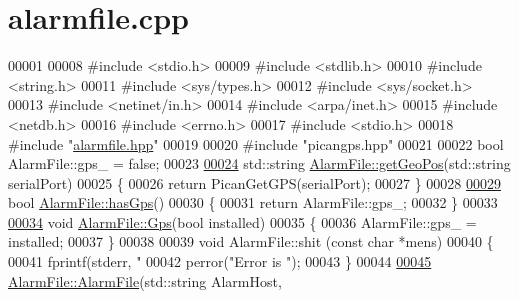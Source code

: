 \hypertarget{alarmfile_8cpp_source}{}\section{alarmfile.\+cpp}
\label{alarmfile_8cpp_source}

\begin{DoxyCode}
00001 
00008 \textcolor{preprocessor}{#include <stdio.h>}
00009 \textcolor{preprocessor}{#include <stdlib.h>}
00010 \textcolor{preprocessor}{#include <string.h>}
00011 \textcolor{preprocessor}{#include <sys/types.h>}
00012 \textcolor{preprocessor}{#include <sys/socket.h>}
00013 \textcolor{preprocessor}{#include <netinet/in.h>}
00014 \textcolor{preprocessor}{#include <arpa/inet.h>}
00015 \textcolor{preprocessor}{#include <netdb.h>}
00016 \textcolor{preprocessor}{#include <errno.h>}
00017 \textcolor{preprocessor}{#include <stdio.h>}
00018 \textcolor{preprocessor}{#include "\hyperlink{alarmfile_8hpp}{alarmfile.hpp}"}
00019 
00020 \textcolor{preprocessor}{#include "picangps.hpp"}
00021 
00022 \textcolor{keywordtype}{bool} AlarmFile::gps\_ = \textcolor{keyword}{false};
00023 
\hyperlink{classAlarmFile_a4865f7e404e938960e45b7e805956401}{00024} std::string \hyperlink{classAlarmFile_a4865f7e404e938960e45b7e805956401}{AlarmFile::getGeoPos}(std::string serialPort)
00025 \{
00026   \textcolor{keywordflow}{return} PicanGetGPS(serialPort);
00027 \}
00028 
\hyperlink{classAlarmFile_ad75728f6e44f38772372b991f21d9caa}{00029} \textcolor{keywordtype}{bool} \hyperlink{classAlarmFile_ad75728f6e44f38772372b991f21d9caa}{AlarmFile::hasGps}()
00030 \{
00031   \textcolor{keywordflow}{return} AlarmFile::gps\_;
00032 \}
00033 
\hyperlink{classAlarmFile_acfb3c406818e76439ba47aa539178f7d}{00034} \textcolor{keywordtype}{void} \hyperlink{classAlarmFile_acfb3c406818e76439ba47aa539178f7d}{AlarmFile::Gps}(\textcolor{keywordtype}{bool} installed)
00035 \{
00036   AlarmFile::gps\_ = installed;
00037 \}
00038 
00039 \textcolor{keywordtype}{void} AlarmFile::shit (\textcolor{keyword}{const} \textcolor{keywordtype}{char} *mens)
00040 \{
00041   fprintf(stderr, \textcolor{stringliteral}{"%
00042   perror(\textcolor{stringliteral}{"Error is "});
00043 \}
00044 
\hyperlink{classAlarmFile_ab5b7a78583764cd70d8b5b93a243439d}{00045} \hyperlink{classAlarmFile_ab5b7a78583764cd70d8b5b93a243439d}{AlarmFile::AlarmFile}(std::string AlarmHost,
}
\end{DoxyCode}
